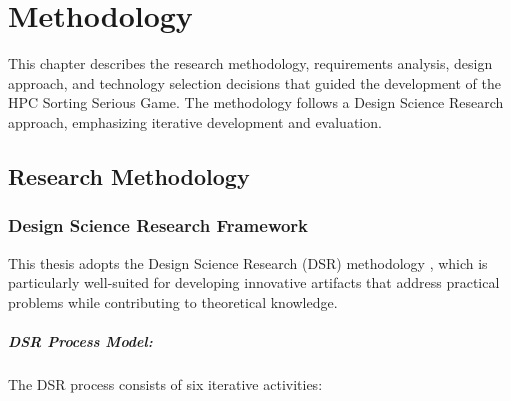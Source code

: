 \chapter{Methodology}
\label{ch:methodology}
This chapter describes the research methodology, requirements analysis, design approach, and technology selection decisions that guided the development of the HPC Sorting Serious Game. The methodology follows a Design Science Research approach, emphasizing iterative development and evaluation.

\section{Research Methodology}
\label{sec:research-methodology}

\subsection{Design Science Research Framework}
\label{subsec:design-science}

This thesis adopts the Design Science Research (DSR) methodology \citep{hevner2004design, peffers2007design}, which is particularly well-suited for developing innovative artifacts that address practical problems while contributing to theoretical knowledge.

\paragraph*{DSR Process Model:}

The DSR process consists of six iterative activities:


